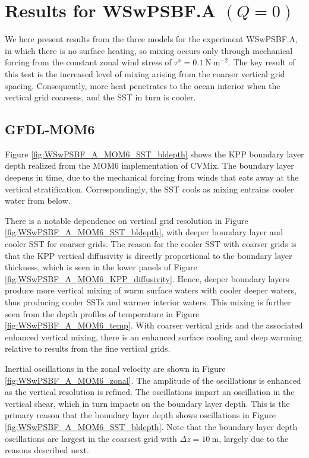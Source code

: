 \section{Results for WSwPSBF.A $(Q=0)$}
\label{section:WSwPSBFA}

We here present results from the three models for the experiment
WSwPSBF.A, in which there is no surface heating, so mixing occurs only
through mechanical forcing from the constant zonal wind stress of
$\tau^{x} = 0.1~\mbox{N}~\mbox{m}^{-2}$.  The key result of this test
is the increased level of mixing arising from the coarser vertical
grid spacing.  Consequently, more heat penetrates to the ocean
interior when the vertical grid coarsens, and the SST in turn is
cooler.

\subsection{GFDL-MOM6} 

Figure \ref{fig:WSwPSBF_A_MOM6_SST_bldepth} shows the KPP boundary
layer depth realized from the MOM6 implementation of CVMix.  The
boundary layer deepens in time, due to the mechanical forcing from
winds that eats away at the vertical stratification.  Correspondingly,
the SST cools as mixing entrains cooler water from below.  

There is a notable dependence on vertical grid resolution in Figure
\ref{fig:WSwPSBF_A_MOM6_SST_bldepth}, with deeper boundary layer and
cooler SST for coarser grids.  The reason for the cooler SST with
coarser grids is that the KPP vertical diffusivity is directly
proportional to the boundary layer thickness, which is seen in the
lower panels of Figure \ref{fig:WSwPSBF_A_MOM6_KPP_diffusivity}.
Hence, deeper boundary layers produce more vertical mixing of warm
surface waters with cooler deeper waters, thus producing cooler SSTs
and warmer interior waters.  This mixing is further seen from the
depth profiles of temperature in Figure \ref{fig:WSwPSBF_A_MOM6_temp}.
With coarser vertical grids and the associated enhanced vertical
mixing, there is an enhanced surface cooling and deep warming relative
to results from the fine vertical grids.  

Inertial oscillations in the zonal velocity are shown in Figure
\ref{fig:WSwPSBF_A_MOM6_zonal}.  The amplitude of the oscillations is
enhanced as the vertical resolution is refined.  The oscillations
impart an oscillation in the vertical shear, which in turn impacts on
the boundary layer depth.  This is the primary reason that the
boundary layer depth shows oscillations in Figure
\ref{fig:WSwPSBF_A_MOM6_SST_bldepth}.  Note that the boundary layer
depth oscillations are largest in the coarsest grid with $\Delta z =
10~\mbox{m}$, largely due to the reasons described next.  


